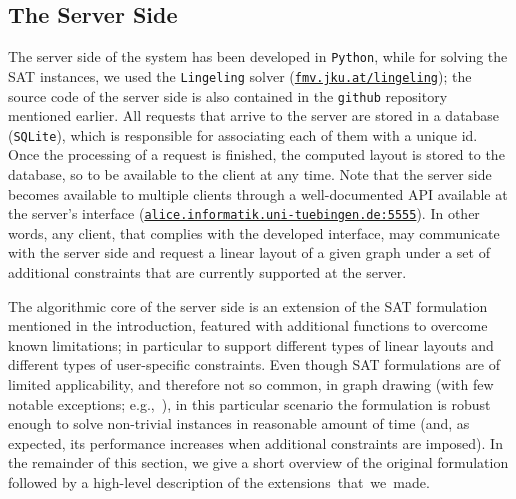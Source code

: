 \documentclass[runningheads]{llncs}
\newcommand\rurl[1]{\href{http://#1}{\nolinkurl{#1}}}
\begin{document}
\subsection{The Server Side}\label{subsec:server}

The server side of the system has been developed in \texttt{Python}, while for solving the SAT instances, we used the \texttt{Lingeling} solver (\rurl{fmv.jku.at/lingeling}); the source code of the server side is also contained in the \texttt{github} repository mentioned earlier. All requests that arrive to the server are stored in a database (\texttt{SQLite}), which is responsible for associating each of them with a unique id. Once the processing of a request is finished, the computed layout is stored to the database, so to be available to the client at any time. Note that the server side becomes available to multiple clients through a well-documented API available at the server's interface (\rurl{alice.informatik.uni-tuebingen.de:5555}). In other words, any client, that complies with the developed interface, may communicate with the server side and request a linear layout of a given graph under a set of additional constraints that are currently supported at the server. 

The algorithmic core of the server side is an extension of the SAT formulation~\cite{DBLP:conf/gd/Bekos0Z15} mentioned in the introduction, featured with additional functions to overcome known limitations; in particular to support  different types of linear layouts and different types of user-specific constraints. Even though SAT formulations are of limited applicability, and therefore not so common, in graph drawing (with few notable exceptions; e.g.,~\cite{DBLP:conf/gd/BiedlBNNPR13,DBLP:conf/gd/ChimaniZ12,DBLP:conf/gd/GangeSM10}), in this particular scenario the formulation is robust enough to solve non-trivial instances in reasonable amount of time (and, as expected, its performance increases when additional constraints are imposed). In the remainder of this section, we give a short overview of the original formulation followed by a high-level description of the extensions~that~we~made. 
\end{document}
